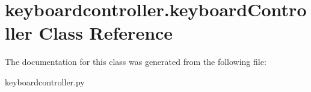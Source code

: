 \hypertarget{classkeyboardcontroller_1_1keyboardController}{\section{keyboardcontroller.\-keyboard\-Controller Class Reference}
\label{classkeyboardcontroller_1_1keyboardController}
}


The documentation for this class was generated from the following file\-:\begin{DoxyCompactItemize}
\item 
keyboardcontroller.\-py\end{DoxyCompactItemize}
